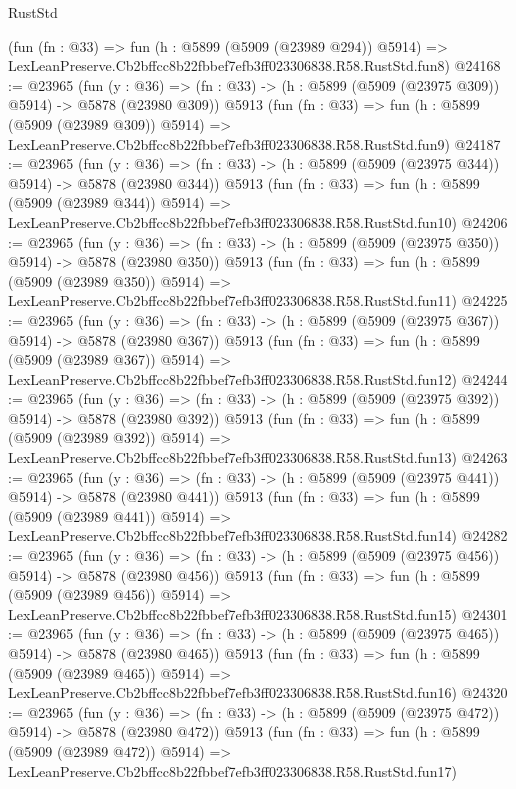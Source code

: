 \begin{lexlean}{RustStd}
\begin{coremodule}
{{    (fun (fn : @33) =>
    fun (h : @5899 (@5909 (@23989 @294)) @5914) =>
    LexLeanPreserve.Cb2bffcc8b22fbbef7efb3ff023306838.R58.RustStd.fun8)
@24168 := @23965
    (fun (y : @36) => (fn : @33) -> (h : @5899 (@5909 (@23975 @309)) @5914) -> @5878 (@23980 @309))
    @5913
    (fun (fn : @33) =>
    fun (h : @5899 (@5909 (@23989 @309)) @5914) =>
    LexLeanPreserve.Cb2bffcc8b22fbbef7efb3ff023306838.R58.RustStd.fun9)
@24187 := @23965
    (fun (y : @36) => (fn : @33) -> (h : @5899 (@5909 (@23975 @344)) @5914) -> @5878 (@23980 @344))
    @5913
    (fun (fn : @33) =>
    fun (h : @5899 (@5909 (@23989 @344)) @5914) =>
    LexLeanPreserve.Cb2bffcc8b22fbbef7efb3ff023306838.R58.RustStd.fun10)
@24206 := @23965
    (fun (y : @36) => (fn : @33) -> (h : @5899 (@5909 (@23975 @350)) @5914) -> @5878 (@23980 @350))
    @5913
    (fun (fn : @33) =>
    fun (h : @5899 (@5909 (@23989 @350)) @5914) =>
    LexLeanPreserve.Cb2bffcc8b22fbbef7efb3ff023306838.R58.RustStd.fun11)
@24225 := @23965
    (fun (y : @36) => (fn : @33) -> (h : @5899 (@5909 (@23975 @367)) @5914) -> @5878 (@23980 @367))
    @5913
    (fun (fn : @33) =>
    fun (h : @5899 (@5909 (@23989 @367)) @5914) =>
    LexLeanPreserve.Cb2bffcc8b22fbbef7efb3ff023306838.R58.RustStd.fun12)
@24244 := @23965
    (fun (y : @36) => (fn : @33) -> (h : @5899 (@5909 (@23975 @392)) @5914) -> @5878 (@23980 @392))
    @5913
    (fun (fn : @33) =>
    fun (h : @5899 (@5909 (@23989 @392)) @5914) =>
    LexLeanPreserve.Cb2bffcc8b22fbbef7efb3ff023306838.R58.RustStd.fun13)
@24263 := @23965
    (fun (y : @36) => (fn : @33) -> (h : @5899 (@5909 (@23975 @441)) @5914) -> @5878 (@23980 @441))
    @5913
    (fun (fn : @33) =>
    fun (h : @5899 (@5909 (@23989 @441)) @5914) =>
    LexLeanPreserve.Cb2bffcc8b22fbbef7efb3ff023306838.R58.RustStd.fun14)
@24282 := @23965
    (fun (y : @36) => (fn : @33) -> (h : @5899 (@5909 (@23975 @456)) @5914) -> @5878 (@23980 @456))
    @5913
    (fun (fn : @33) =>
    fun (h : @5899 (@5909 (@23989 @456)) @5914) =>
    LexLeanPreserve.Cb2bffcc8b22fbbef7efb3ff023306838.R58.RustStd.fun15)
@24301 := @23965
    (fun (y : @36) => (fn : @33) -> (h : @5899 (@5909 (@23975 @465)) @5914) -> @5878 (@23980 @465))
    @5913
    (fun (fn : @33) =>
    fun (h : @5899 (@5909 (@23989 @465)) @5914) =>
    LexLeanPreserve.Cb2bffcc8b22fbbef7efb3ff023306838.R58.RustStd.fun16)
@24320 := @23965
    (fun (y : @36) => (fn : @33) -> (h : @5899 (@5909 (@23975 @472)) @5914) -> @5878 (@23980 @472))
    @5913
    (fun (fn : @33) =>
    fun (h : @5899 (@5909 (@23989 @472)) @5914) =>
    LexLeanPreserve.Cb2bffcc8b22fbbef7efb3ff023306838.R58.RustStd.fun17)
}}
\end{coremodule}
\end{lexlean}

